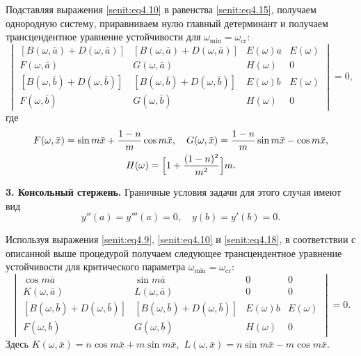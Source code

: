 Подставляя выражения \eqref{senit:eq4.10} в равенства \eqref{senit:eq4.15}, получаем однородную систему, приравниваем нулю главный детерминант и получаем трансцендентное уравнение устойчивости для  $\omega_{\min}=\omega_{\text{cr}}$:
\begin{equation}
\label{senit:eq4.16}
\begin{vmatrix}
\left[B (\omega,\bar{a}) + D (\omega,\bar{a}) \right] &  \left[B(\omega,\bar{a})+D(\omega,\bar{a}) \right] & E(\omega )a& E(\omega ) \\
F(\omega,\bar{a}) & G(\omega,\bar{a}) & H(\omega) & 0  \\
\left[ B (\omega , \bar{b} ) + D (\omega, \bar{b}) \right] &  \left[ B (\omega,\bar{b})+ D (\omega,\bar{b})\right] & E( \omega )b & E (\omega) \\
F(\omega,\bar{b}) & G(\omega,\bar{b}) & H(\omega)  & 0 
\end{vmatrix}=0,
\end{equation}
где
\begin{gather}
\label{senit:eq4.17}
F(\omega ,\bar  {x} )=\sin m\bar x +\frac{1-n}{m}\cos m\bar x,\quad  G(\omega ,\bar x)=\frac{1-n}{m}\sin m\bar x -\cos m\bar x,\\
 H(\omega )=\Bigl[1+\frac{(1-n)^2}{m^2} \Bigr]m.
\end{gather}

\pagebreak


\textbf{3. Консольный стержень.}
Граничные условия задачи для этого случая имеют вид
\begin{equation}
\label{senit:eq4.18}
y''(a)=y'''(a)=0, \quad   y(b)=y'(b)=0.
\end{equation}



Используя выражения \eqref{senit:eq4.9}, \eqref{senit:eq4.10} и \eqref{senit:eq4.18}, в соответствии с описанной
выше процедурой получаем следующее трансцендентное уравнение устойчивости для критического параметра $\omega_{\min}=\omega_{\text{cr}}$:
\begin{equation}
\label{senit:eq4.19}
\begin{vmatrix}
\cos m \bar {a} & \sin m \bar {a}  & 0 &  0 \\
K (\omega, \bar{a}) & L (\omega, \bar {a}) & 0 & 0 \\
\left[ B(\omega ,\bar {b})+D (\omega, \bar {b})\right] & \left[B (\omega
, \bar {b} )+D (\omega , \bar {b})\right] &  E ( \omega ) b & E (\omega)\\
F(\omega,\bar {b}) & G (\omega, \bar {b}) & H ( \omega ) & 0 
\end{vmatrix}=0.
\end{equation}
Здесь 
$
K (\omega ,\bar {x})=n\cos m\bar {x}+m\sin m\bar {x},$
$L (\omega ,\bar {x})=n\sin m\bar {x}-m\cos
m\bar {x}.$


